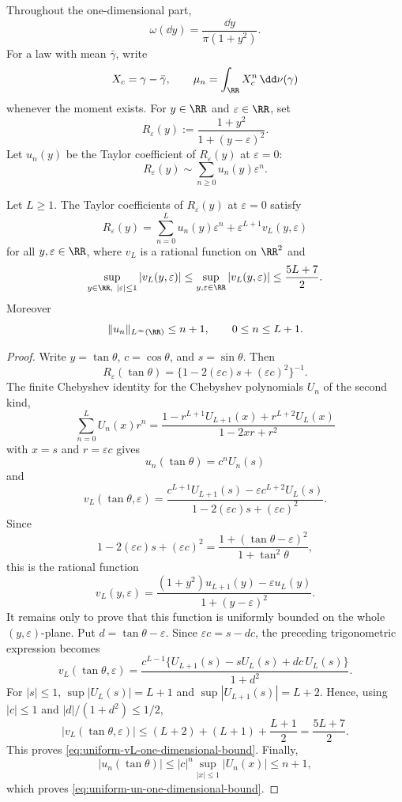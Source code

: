Throughout the one-dimensional part,
\[
  \omega(\dd y)=\frac{\dd y}{\pi(1+y^2)}.
\]
For a law with mean \(\bar{\gamma}\), write
\[
  X_c=\gamma-\bar{\gamma},\qquad
  \mu_n=\int_{\RR} X_c^n\,\dd\nu(\gamma)
\]
whenever the moment exists.  For \(y\in\RR\) and \(\varepsilon\in\RR\), set
\[
R_\varepsilon(y):=\frac{1+y^2}{1+(y-\varepsilon)^2}.
\]
Let \(u_n(y)\) be the Taylor coefficient of \(R_\varepsilon(y)\) at
\(\varepsilon=0\):
\[
  R_\varepsilon(y)\sim\sum_{n\ge0}u_n(y)\varepsilon^n .
\]
\begin{lemma}%
\label{lem:uniform-one-dimensional-cayley-taylor-remainder}
Let \(L\ge1\).  The Taylor coefficients of \(R_\varepsilon(y)\) at
\(\varepsilon=0\) satisfy
\[
  R_\varepsilon(y)=\sum_{n=0}^{L}u_n(y)\varepsilon^n
  +\varepsilon^{L+1}v_L(y,\varepsilon)
\]
for all \(y,\varepsilon\in\RR\), where \(v_L\) is a rational function on
\(\RR^2\) and
\begin{equation}\label{eq:uniform-vL-one-dimensional-bound}
  \sup_{y\in\RR,\ |\varepsilon|\le1}|v_L(y,\varepsilon)|
  \le \sup_{y,\varepsilon\in\RR}|v_L(y,\varepsilon)|
  \le \frac{5L+7}{2}.
\end{equation}
Moreover
\begin{equation}\label{eq:uniform-un-one-dimensional-bound}
  \|u_n\|_{L^\infty(\RR)}\le n+1,\qquad 0\le n\le L+1 .
\end{equation}
\end{lemma}

\begin{proof}
Write \(y=\tan\theta\), \(c=\cos\theta\), and \(s=\sin\theta\).  Then
\[
R_\varepsilon(\tan\theta)
=\{1-2(\varepsilon c)s+(\varepsilon c)^2\}^{-1}.
\]
The finite Chebyshev identity for the Chebyshev polynomials \(U_n\) of the
second kind,
\[
\sum_{n=0}^{L}U_n(x)r^n
=\frac{1-r^{L+1}U_{L+1}(x)+r^{L+2}U_L(x)}
       {1-2xr+r^2}
\]
with \(x=s\) and \(r=\varepsilon c\) gives
\[
  u_n(\tan\theta)=c^nU_n(s)
\]
and
\[
v_L(\tan\theta,\varepsilon)
=\frac{c^{L+1}U_{L+1}(s)-\varepsilon c^{L+2}U_L(s)}
       {1-2(\varepsilon c)s+(\varepsilon c)^2}.
\]
Since
\[
1-2(\varepsilon c)s+(\varepsilon c)^2
=\frac{1+(\tan\theta-\varepsilon)^2}{1+\tan^2\theta},
\]
this is the rational function
\[
v_L(y,\varepsilon)
=\frac{(1+y^2)u_{L+1}(y)-\varepsilon u_L(y)}
       {1+(y-\varepsilon)^2}.
\]
It remains only to prove that this function is uniformly bounded on the whole
\((y,\varepsilon)\)-plane.  Put \(d=\tan\theta-\varepsilon\).  Since
\(\varepsilon c=s-dc\), the preceding trigonometric expression becomes
\[
v_L(\tan\theta,\varepsilon)
=\frac{c^{L-1}\{U_{L+1}(s)-sU_L(s)+dc\,U_L(s)\}}
       {1+d^2}.
\]
For \(|s|\le1\), \(\sup |U_L(s)|=L+1\) and
\(\sup |U_{L+1}(s)|=L+2\).  Hence, using
\(|c|\le1\) and \(|d|/(1+d^2)\le1/2\),
\[
|v_L(\tan\theta,\varepsilon)|
\le (L+2)+(L+1)+\frac{L+1}{2}
=\frac{5L+7}{2}.
\]
This proves \eqref{eq:uniform-vL-one-dimensional-bound}.  Finally,
\[
  |u_n(\tan\theta)|\le |c|^n\sup_{|x|\le1}|U_n(x)|\le n+1,
\]
which proves \eqref{eq:uniform-un-one-dimensional-bound}.
\end{proof}

